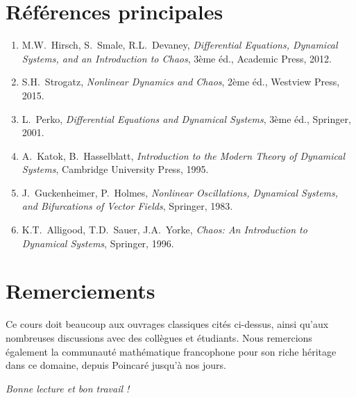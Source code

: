 \section*{R\'ef\'erences principales}

\begin{enumerate}
    \item M.W.~Hirsch, S.~Smale, R.L.~Devaney, \emph{Differential Equations,
    Dynamical Systems, and an Introduction to Chaos}, 3\`eme \'ed.,
    Academic Press, 2012.
    \item S.H.~Strogatz, \emph{Nonlinear Dynamics and Chaos}, 2\`eme \'ed.,
    Westview Press, 2015.
    \item L.~Perko, \emph{Differential Equations and Dynamical Systems},
    3\`eme \'ed., Springer, 2001.
    \item A.~Katok, B.~Hasselblatt, \emph{Introduction to the Modern Theory
    of Dynamical Systems}, Cambridge University Press, 1995.
    \item J.~Guckenheimer, P.~Holmes, \emph{Nonlinear Oscillations, Dynamical
    Systems, and Bifurcations of Vector Fields}, Springer, 1983.
    \item K.T.~Alligood, T.D.~Sauer, J.A.~Yorke, \emph{Chaos: An Introduction
    to Dynamical Systems}, Springer, 1996.
\end{enumerate}

\section*{Remerciements}

Ce cours doit beaucoup aux ouvrages classiques cit\'es ci-dessus, ainsi
qu'aux nombreuses discussions avec des coll\`egues et \'etudiants. Nous
remercions \'egalement la communaut\'e math\'ematique francophone pour
son riche h\'eritage dans ce domaine, depuis Poincar\'e jusqu'\`a nos jours.

\vfill
\begin{flushright}
\textit{Bonne lecture et bon travail !}
\end{flushright}
